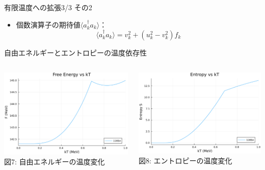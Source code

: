\documentclass[aspectratio=169, 12pt, dvipdfmx]{beamer}
\begin{document}
\begin{frame}{有限温度への拡張3/3 その2}
  \begin{itemize}
    \item 個数演算子の期待値\( \langle a^{\dagger}_k a_k \rangle \)：
    \[
      \langle a^{\dagger}_k a_k \rangle = v_k^2 + (u_k^2 -v_k^2)f_k
    \]
  \end{itemize}
\end{frame}

\begin{frame}{自由エネルギーとエントロピーの温度依存性}
  \begin{columns}[totalwidth=1.0\linewidth]
    \begin{column}[T]{0.5\linewidth}
      \centering
      \includegraphics[width=\textwidth]{fig_pdf/F_vs_kT.pdf}
      \vspace{5pt} %
      \scriptsize 図7: 自由エネルギーの温度変化
    \end{column}

  \begin{column}[T]{0.5\linewidth}
    \centering
    \includegraphics[width=\textwidth]{fig_pdf/S_vs_kT.pdf}
    \vspace{5pt} %
    \scriptsize 図8: エントロピーの温度変化
  \end{column}
  \end{columns}
\end{frame}
\end{document}
